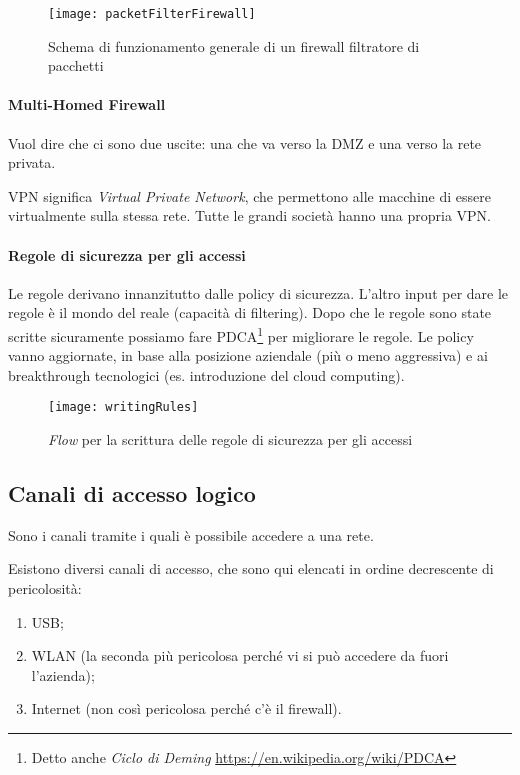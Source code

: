 \begin{figure}[H]
 \centering
 \texttt{[image: packetFilterFirewall]}
 \caption{Schema di funzionamento generale di un firewall filtratore di
pacchetti}
\end{figure}

\paragraph*{Multi-Homed Firewall}

Vuol dire che ci sono due uscite: una che va verso la DMZ e una verso la rete
privata.

VPN significa \textit{Virtual Private Network}, che permettono alle macchine di
essere virtualmente sulla stessa rete. Tutte le grandi società hanno una propria
VPN.

\paragraph*{Regole di sicurezza per gli accessi}

Le regole derivano innanzitutto dalle policy di sicurezza. L'altro input per
dare le regole è il mondo del reale (capacità di filtering). Dopo che le regole
sono state scritte sicuramente possiamo fare PDCA\footnote{Detto anche
\textit{Ciclo di Deming} \url{https://en.wikipedia.org/wiki/PDCA}} per
migliorare le regole. Le policy vanno aggiornate,
in base alla posizione aziendale (più o meno aggressiva) e ai breakthrough
tecnologici (es. introduzione del cloud computing).

\begin{figure}[H]
 \centering
 \texttt{[image: writingRules]}
 \caption{\textit{Flow} per la scrittura delle regole di sicurezza per gli
accessi}
\end{figure}

\subsection{Canali di accesso logico}

Sono i canali tramite i quali è possibile accedere a una rete.

Esistono diversi canali di accesso, che sono qui elencati in ordine
decrescente di pericolosità:
\begin{enumerate}
 \item USB;
 \item WLAN (la seconda più pericolosa perché vi si può accedere da fuori
l'azienda);
 \item Internet (non così pericolosa perché c'è il firewall).
\end{enumerate}

